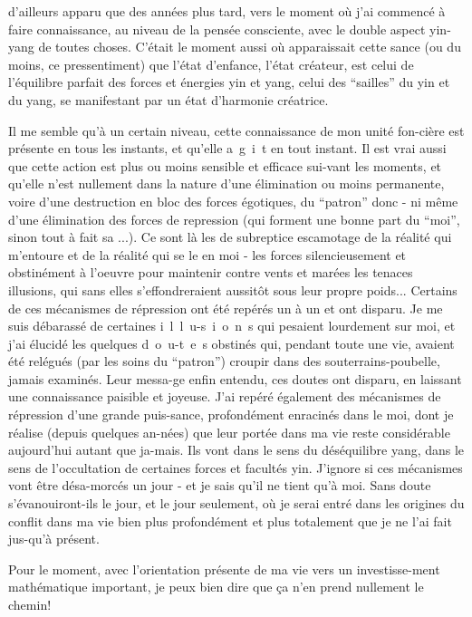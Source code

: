 d'ailleurs apparu que des années plus tard, vers le moment où j'ai commencé à faire connaissance, au niveau de la pensée consciente, avec le double aspect yin-yang de toutes choses. C'était le moment aussi où apparaissait cette \linebreak sance (ou du moins, ce pressentiment) que l'état d'enfance, l'état créateur, est celui de l'équilibre parfait des forces et énergies yin et yang, celui des ``\linebreak sailles'' du yin et du yang, se manifestant par un état d'harmonie créatrice.

Il me semble qu'à un certain niveau, cette connaissance de mon unité fon-\linebreak cière est présente en tous les instants, et qu'elle \mbox{a g i t} en tout instant. Il est vrai aussi que cette action est plus ou moins sensible et efficace sui-\linebreak vant les moments, et qu'elle n'est nullement dans la nature d'une élimination  ou moins permanente, voire d'une destruction en bloc des forces égotiques, du ``patron'' donc - ni même d'une élimination des forces de repression (qui forment une bonne part du ``moi'', sinon tout à fait sa ...). Ce sont là les  de subreptice escamotage de la réalité qui m'entoure et de la réalité qui se \linebreak le en moi - les forces silencieusement et obstinément à l'oeuvre pour maintenir contre vents et marées les tenaces illusions, qui sans elles s'effondreraient aussitôt sous leur propre poids... Certains de ces mécanismes de répression ont été repérés un à un et ont disparu. Je me suis débarassé de certaines \mbox{i l l u-}\linebreak\mbox{s i o n s} qui pesaient lourdement sur moi, et j'ai élucidé les quelques \mbox{d o u-}\linebreak\mbox{t e s} obstinés qui, pendant toute une vie, avaient été relégués (par les soins du ``patron'') croupir dans des souterrains-poubelle, jamais examinés. Leur messa-\linebreak ge enfin entendu, ces doutes ont disparu, en laissant une connaissance paisible et joyeuse. J'ai repéré également des mécanismes de répression d'une grande puis-\linebreak sance, profondément enracinés dans le moi, dont je réalise (depuis quelques an-\linebreak nées) que leur portée dans ma vie reste considérable aujourd'hui autant que ja-\linebreak mais. Ils vont dans le sens du déséquilibre yang, dans le sens de l'occultation de certaines forces et facultés yin. J'ignore si ces mécanismes vont être désa-\linebreak morcés un jour - et je sais qu'il ne tient qu'à moi. Sans doute s'évanouiront-ils le jour, et le jour seulement, où je serai entré dans les origines du conflit \inserted{\unsure{:}} dans ma vie bien plus profondément et plus totalement que je ne l'ai fait jus-\linebreak qu'à présent.

Pour le moment, avec l'orientation présente de ma vie vers un investisse-\linebreak ment mathématique important, je peux bien dire que ça n'en prend nullement le chemin!
